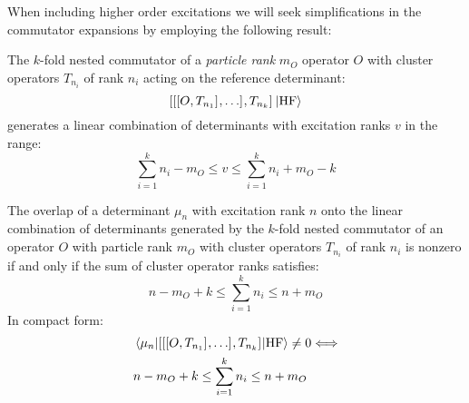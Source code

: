 When including higher order excitations we will seek simplifications in the commutator expansions
by employing the following result:\autocite{Helgaker2000-tz}
\begin{lemma}\label{lemma:exc-rank}
The $k$-fold nested commutator of a \emph{particle rank} $m_O$ operator $O$ with
cluster operators $T_{n_i}$ of rank $n_i$ acting on the reference determinant:
\begin{equation}
  [ [ [ O, T_{n_1} ]^{}, \ldots ]^{}, T_{n_k} ]^{} \ket{\mathrm{HF}}
\end{equation}
generates a linear combination of determinants with excitation ranks $v$ in the
range:
\begin{equation}
  \sum_{i=1}^k n_i - m_O \leq v \leq \sum_{i=1}^k n_i + m_O -k
\end{equation}
\end{lemma}
\begin{corollary}
The overlap of a determinant $\mu_n$ with excitation rank $n$ onto the linear
combination of determinants generated by the $k$-fold nested commutator of an
operator $O$ with particle rank $m_O$ with cluster operators $T_{n_i}$ of rank $n_i$ is
nonzero if and only if the sum of cluster operator ranks satisfies:
\begin{equation}
  n - m_O + k \leq \sum_{i=1}^k n_i \leq n + m_O
\end{equation}
In compact form:
\begin{equation}
\begin{aligned}
  &\braket{\mu_n |
  [ [ [ O, T_{n_1} ]^{}, \ldots ]^{}, T_{n_k} ]^{} | \mathrm{HF}} \neq 0
  \Longleftrightarrow \\
  &n - m_O + k \leq \sum_{i=1}^k n_i \leq n + m_O
\end{aligned}
\end{equation}
\end{corollary}

